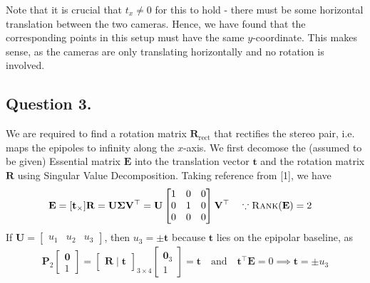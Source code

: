 \documentclass[10pt]{article}
\begin{document}
    Note that it is crucial that $t_{x} \neq 0$ for this to hold - there must
    be some horizontal translation between the two cameras. Hence, we have
    found that the corresponding points in this setup must have the same
    $y$-coordinate. This makes sense, as the cameras are only translating
    horizontally and no rotation is involved.

    \subsection*{\textbf{Question 3.}}
    We are required to find a rotation matrix $\mathbf{R}_{\text{rect}}$ that
    rectifies the stereo pair, i.e. maps the epipoles to infinity along the $x$-axis.
    We first decomose the (assumed to be given) Essential matrix $\mathbf{E}$ into
    the translation vector $\mathbf{t}$ and the rotation matrix $\mathbf{R}$ using
    Singular Value Decomposition. Taking reference from [1], we have
    \begin{align*}
        \mathbf{E} &= [\mathbf{t}_{\times}] \mathbf{R}
        = \mathbf{U} \mathbf{\Sigma} \mathbf{V}^{\top} = \mathbf{U} \begin{bmatrix}
            1 & 0 & 0 \\
            0 & 1 & 0 \\
            0 & 0 & 0
        \end{bmatrix} \mathbf{V}^{\top} \quad \because \textsc{Rank}(\mathbf{E}) = 2
    \end{align*}
    If $\mathbf{U} = \begin{bmatrix} u_{1} & u_{2} & u_{3} \end{bmatrix}$, then
    $u_{3} = \pm \mathbf{t}$ because $\mathbf{t}$ lies on the epipolar baseline, as
    \begin{align*}
        \mathbf{P}_{2} \begin{bmatrix}
            \mathbf{0} \\ 1
        \end{bmatrix} = \begin{bmatrix}
            \mathbf{R} \mid \mathbf{t}
        \end{bmatrix}_{3 \times 4} \begin{bmatrix}
            \mathbf{0}_{3} \\ 1
        \end{bmatrix} = \mathbf{t}
        \quad \text{and} \quad
        \mathbf{t}^{\top} \mathbf{E} = 0 \implies \mathbf{t} = \pm u_{3}
    \end{align*}
\end{document}
